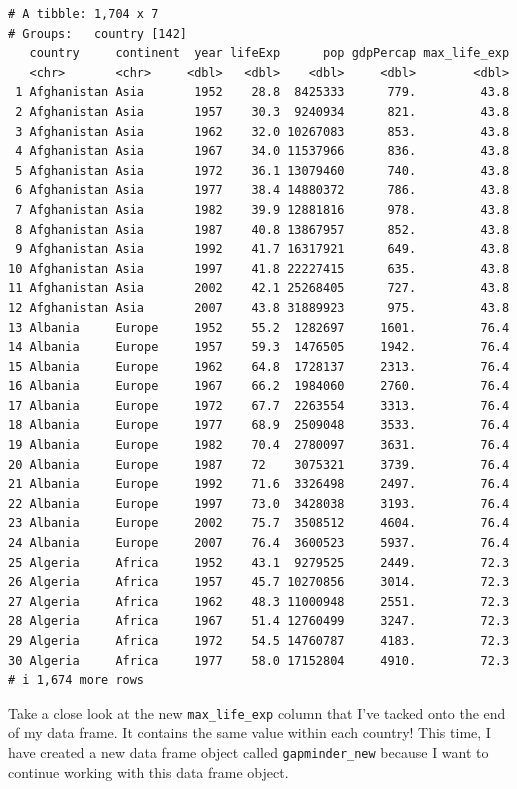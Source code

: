 \documentclass[
  letterpaper,
  DIV=11,
  numbers=noendperiod]{scrreprt}
\begin{document}
\begin{verbatim}
# A tibble: 1,704 x 7
# Groups:   country [142]
   country     continent  year lifeExp      pop gdpPercap max_life_exp
   <chr>       <chr>     <dbl>   <dbl>    <dbl>     <dbl>        <dbl>
 1 Afghanistan Asia       1952    28.8  8425333      779.         43.8
 2 Afghanistan Asia       1957    30.3  9240934      821.         43.8
 3 Afghanistan Asia       1962    32.0 10267083      853.         43.8
 4 Afghanistan Asia       1967    34.0 11537966      836.         43.8
 5 Afghanistan Asia       1972    36.1 13079460      740.         43.8
 6 Afghanistan Asia       1977    38.4 14880372      786.         43.8
 7 Afghanistan Asia       1982    39.9 12881816      978.         43.8
 8 Afghanistan Asia       1987    40.8 13867957      852.         43.8
 9 Afghanistan Asia       1992    41.7 16317921      649.         43.8
10 Afghanistan Asia       1997    41.8 22227415      635.         43.8
11 Afghanistan Asia       2002    42.1 25268405      727.         43.8
12 Afghanistan Asia       2007    43.8 31889923      975.         43.8
13 Albania     Europe     1952    55.2  1282697     1601.         76.4
14 Albania     Europe     1957    59.3  1476505     1942.         76.4
15 Albania     Europe     1962    64.8  1728137     2313.         76.4
16 Albania     Europe     1967    66.2  1984060     2760.         76.4
17 Albania     Europe     1972    67.7  2263554     3313.         76.4
18 Albania     Europe     1977    68.9  2509048     3533.         76.4
19 Albania     Europe     1982    70.4  2780097     3631.         76.4
20 Albania     Europe     1987    72    3075321     3739.         76.4
21 Albania     Europe     1992    71.6  3326498     2497.         76.4
22 Albania     Europe     1997    73.0  3428038     3193.         76.4
23 Albania     Europe     2002    75.7  3508512     4604.         76.4
24 Albania     Europe     2007    76.4  3600523     5937.         76.4
25 Algeria     Africa     1952    43.1  9279525     2449.         72.3
26 Algeria     Africa     1957    45.7 10270856     3014.         72.3
27 Algeria     Africa     1962    48.3 11000948     2551.         72.3
28 Algeria     Africa     1967    51.4 12760499     3247.         72.3
29 Algeria     Africa     1972    54.5 14760787     4183.         72.3
30 Algeria     Africa     1977    58.0 17152804     4910.         72.3
# i 1,674 more rows
\end{verbatim}

Take a close look at the new \texttt{max\_life\_exp} column that I've
tacked onto the end of my data frame. It contains the same value within
each country! This time, I have created a new data frame object called
\texttt{gapminder\_new} because I want to continue working with this
data frame object.
\end{document}
